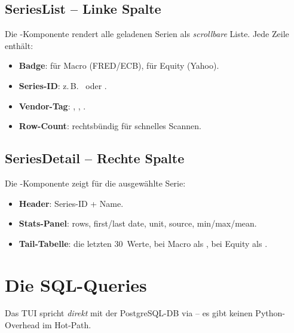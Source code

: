 \subsection{SeriesList -- Linke Spalte}

Die -Komponente rendert alle geladenen Serien als
\emph{scrollbare} Liste. Jede Zeile enthält:

\begin{itemize}
  \item \textbf{Badge}:  für Macro (FRED/ECB),  für
        Equity (Yahoo).
  \item \textbf{Series-ID}: z.\,B.\  oder
        .
  \item \textbf{Vendor-Tag}: , , .
  \item \textbf{Row-Count}: rechtsbündig für schnelles Scannen.
\end{itemize}

\subsection{SeriesDetail -- Rechte Spalte}

Die -Komponente zeigt für die ausgewählte Serie:

\begin{itemize}
  \item \textbf{Header}: Series-ID + Name.
  \item \textbf{Stats-Panel}: rows, first/last date, unit, source,
        min/max/mean.
  \item \textbf{Tail-Tabelle}: die letzten 30~Werte, bei Macro
        als , bei Equity als
        .
\end{itemize}

\section{Die SQL-Queries}

Das TUI spricht \emph{direkt} mit der PostgreSQL-DB via
 -- es gibt keinen Python-Overhead im Hot-Path.

